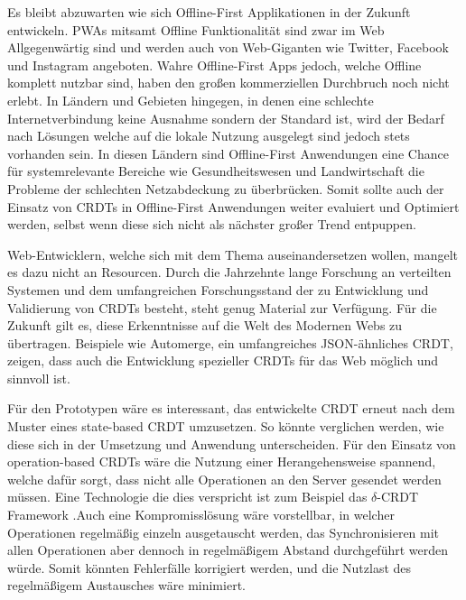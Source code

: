 \documentclass[a4paper, 12pt]{scrreprt}
\begin{document}
Es bleibt abzuwarten wie sich Offline-First Applikationen in der Zukunft entwickeln. PWAs mitsamt Offline Funktionalität sind zwar im Web Allgegenwärtig sind und werden auch von Web-Giganten wie Twitter, Facebook und Instagram angeboten. Wahre Offline-First Apps jedoch, welche Offline komplett nutzbar sind, haben den großen kommerziellen Durchbruch noch nicht erlebt. In Ländern und Gebieten hingegen, in denen eine schlechte Internetverbindung keine Ausnahme sondern der Standard ist, wird der Bedarf nach Lösungen welche auf die lokale Nutzung ausgelegt sind jedoch stets vorhanden sein. In diesen Ländern sind Offline-First Anwendungen eine Chance für systemrelevante Bereiche wie Gesundheitswesen und Landwirtschaft die Probleme der schlechten Netzabdeckung zu überbrücken. Somit sollte auch der Einsatz von CRDTs in Offline-First Anwendungen weiter evaluiert und Optimiert werden, selbst wenn diese sich nicht als nächster großer Trend entpuppen. 

Web-Entwicklern, welche sich mit dem Thema auseinandersetzen wollen, mangelt es dazu nicht an Resourcen. Durch die Jahrzehnte lange Forschung an verteilten Systemen und dem umfangreichen Forschungsstand der zu Entwicklung und Validierung von CRDTs besteht, steht genug Material zur Verfügung. Für die Zukunft gilt es, diese Erkenntnisse auf die Welt des Modernen Webs zu übertragen. Beispiele wie Automerge, ein umfangreiches JSON-ähnliches CRDT, zeigen, dass auch die Entwicklung spezieller CRDTs für das Web möglich und sinnvoll ist. 

Für den Prototypen wäre es interessant, das entwickelte CRDT erneut nach dem Muster eines state-based CRDT umzusetzen. So könnte verglichen werden, wie diese sich in der Umsetzung und Anwendung unterscheiden. Für den Einsatz von operation-based CRDTs wäre die Nutzung einer Herangehensweise spannend, welche dafür sorgt, dass nicht alle Operationen an den Server gesendet werden müssen. Eine Technologie die dies verspricht ist zum Beispiel das $\delta$-CRDT Framework \autocite{articleDeltaCRDT}.Auch eine Kompromisslösung wäre vorstellbar, in welcher Operationen regelmäßig einzeln ausgetauscht werden, das Synchronisieren mit allen Operationen aber dennoch in regelmäßigem Abstand durchgeführt werden würde. Somit könnten Fehlerfälle korrigiert werden, und die Nutzlast des regelmäßigem Austausches wäre minimiert.







\newpage
\listoffigures
\newpage
\lstlistoflistings
\newpage
\printbibliography
\end{document}
